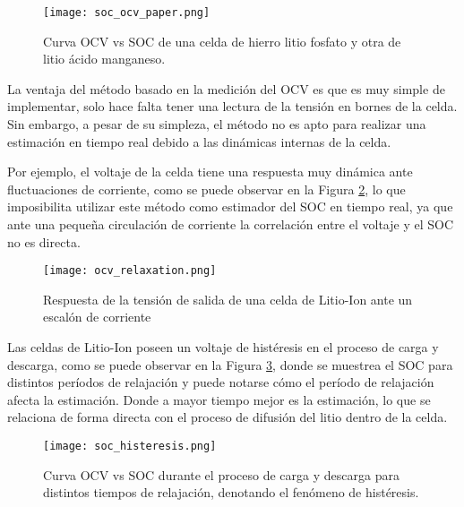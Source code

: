 \begin{figure}[h!]
    \begin{center}
        \texttt{[image: soc\_ocv\_paper.png]}
        \caption{Curva \acrshort{OCV} vs \acrshort{SOC} de una celda de hierro
        litio fosfato y otra de litio \'acido manganeso.}
        \label{soc_ocv_paper}
    \end{center}
\end{figure}

\noindent La ventaja del m\'etodo basado en la medici\'on del \acrshort{OCV} es
que es muy simple de implementar, solo hace falta tener una lectura de la
tensi\'on en bornes de la celda. Sin embargo, a pesar de su simpleza, el
m\'etodo no es apto para realizar una estimaci\'on en tiempo real debido a las
din\'amicas internas de la celda.

\noindent Por ejemplo, el voltaje de la celda tiene una respuesta muy din\'amica
ante fluctuaciones de corriente, como se puede observar en la Figura
\ref{relaxation_ocv}, lo que imposibilita utilizar este m\'etodo como estimador
del \acrshort{SOC} en tiempo real, ya que ante una pequeña circulaci\'on de
corriente la correlaci\'on entre el voltaje y el \acrshort{SOC} no es directa.

\begin{figure}[h!]
    \begin{center}
        \texttt{[image: ocv\_relaxation.png]}
        \caption{Respuesta de la tensi\'on de salida de una celda de Litio-Ion
        ante un escal\'on de corriente}
        \label{relaxation_ocv}
    \end{center}
\end{figure}

\noindent Las celdas de Litio-Ion poseen un voltaje de hist\'eresis en el 
proceso de carga y descarga, como se puede observar en la 
Figura \ref{histeresis_plot}, donde se muestrea el \acrshort{SOC} para 
distintos per\'iodos de relajaci\'on y puede notarse cómo el per\'iodo de 
relajaci\'on afecta la estimaci\'on. Donde a mayor tiempo mejor es la 
estimaci\'on, lo que se relaciona de forma directa con el proceso de 
difusi\'on del litio dentro de la celda.

\begin{figure}[h!]
    \begin{center}
        \texttt{[image: soc\_histeresis.png]}
        \caption{Curva \acrshort{OCV} vs \acrshort{SOC} durante el proceso de
            carga y descarga para distintos tiempos de relajaci\'on, denotando
            el fen\'omeno de hist\'eresis.} 
        \label{histeresis_plot}
    \end{center}
\end{figure}

